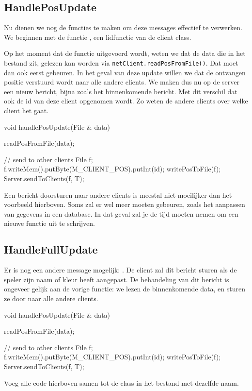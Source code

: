 \subsection{HandlePosUpdate}
Nu dienen we nog de functies te maken om deze messages effectief te verwerken. We beginnen met de functie , een lidfunctie van de client class. 

Op het moment dat de functie uitgevoerd wordt, weten we dat de data die in het bestand zit, gelezen kan worden via \texttt{netClient.readPosFromFile()}. Dat moet dan ook eerst gebeuren. In het geval van deze update willen we dat de ontvangen positie verstuurd wordt naar alle andere clients. We maken dus nu op de server een nieuw bericht, bijna zoals het binnenkomende bericht. Met dit verschil dat ook de id van deze client opgenomen wordt. Zo weten de andere clients over welke client het gaat.

\begin{code}
void handlePosUpdate(File & data)
{
	readPosFromFile(data);
	
	// send to other clients
	File f;
	f.writeMem().putByte(M_CLIENT_POS).putInt(id);
	writePosToFile(f);
	Server.sendToClients(f, T);
}
\end{code}

Een bericht doorsturen naar andere clients is meestal niet moeilijker dan het voorbeeld hierboven. Soms zal er wel meer moeten gebeuren, zoals het aanpassen van gegevens in een database. In dat geval zal je de tijd moeten nemen om een nieuwe functie uit te schrijven.

\subsection{HandleFullUpdate}
Er is nog een andere message mogelijk: . De client zal dit bericht sturen als de speler zijn naam of kleur heeft aangepast. De behandeling van dit bericht is ongeveer gelijk aan de vorige functie: we lezen de binnenkomende data, en sturen ze door naar alle andere clients.

\begin{code}
void handlePosUpdate(File & data)
{
	readPosFromFile(data);
	
	// send to other clients
	File f;
	f.writeMem().putByte(M_CLIENT_POS).putInt(id);
	writePosToFile(f);
	Server.sendToClients(f, T);
}
\end{code}

\begin{exercise}
Voeg alle code hierboven samen tot de class  in het bestand met dezelfde naam.
\end{exercise}

 
